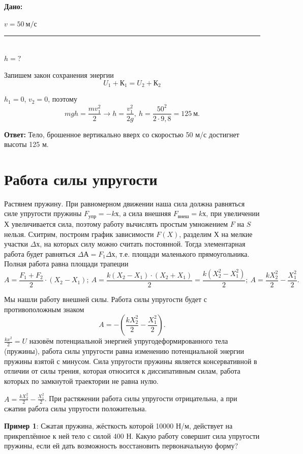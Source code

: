 \documentclass[a6paper, 11pt]{diss_4}
\renewcommand{\'}{\,'}
\begin{document}
\hspace{1cm}\textbf{Дано:}\hspace{.3cm}
\parbox[t]{4cm}{
$v= 50\ м/с$\\
\rule{4cm}{.4pt}\\
$h = ?$\\
}

Запишем закон сохранения энергии
\[
U_1+К_1=U_2+К_2
\]

$h_1=0$,   $v_2=0$, поэтому
\[
mgh=\frac{mv^2_1}{2}\to
h=\frac{v^2_1}{2g},\
h=\frac{50^2}{2\cdot9,8}=125\ м.
\]

\textbf{Ответ:} Тело, брошенное вертикально вверх со скоростью 50 м/с достигнет высоты 125 м.

\section{Работа силы упругости}

Растянем пружину. При равномерном движении наша сила должна равняться силе упругости пружины $F_{упр}=-kх$, а сила внешняя $F_{внеш} = kх$, при увеличении $Х$ увеличивается сила, поэтому работу вычислять простым умножением $F$ на $S$ нельзя. Схитрим, построим график зависимости $F(X)$, разделим $Х$ на мелкие участки $\Delta х$, на которых силу можно считать постоянной. Тогда элементарная работа будет равняться $\Delta А=F_1\Delta х$, т.е. площади маленького прямоугольника. Полная работа равна площади трапеции
\[
A=\frac{F_1+F_2}{2}\cdot (X_2-X_1);\ A=\frac{k(X_2-X_1)\cdot(X_2+X_1)}{2}=\frac{k(X_2^2-X_1^2)}{2};\
A=\frac{kX_2^2}{2}-\frac{X_1^2}{2}.
\]

Мы нашли работу внешней силы. Работа силы упругости будет с противоположным знаком
\[
A=-(\frac{kX_2^2}{2}-\frac{X_1^2}{2}).
\]
$\frac{kx^2}{2}=U$ назовём потенциальной энергией упругодеформированного тела (пружины), работа силы упругости равна изменению потенциальной энергии пружины взятой с минусом. Сила упругости пружины является консервативной в отличии от силы трения, которая относится к диссипативным силам, работа которых по замкнутой траектории не равна нулю.

$A=\frac{kX_2^2}{2}-\frac{X_1^2}{2}$. При растяжении работа силы упругости отрицательна, а при сжатии работа силы упругости положительна.

\textbf{Пример 1}: Сжатая пружина, жёсткость которой 10000 Н/м, действует на прикреплённое к ней тело с силой 400 Н. Какую работу совершит сила упругости пружины, если ей дать возможность восстановить первоначальную форму?
\end{document}
